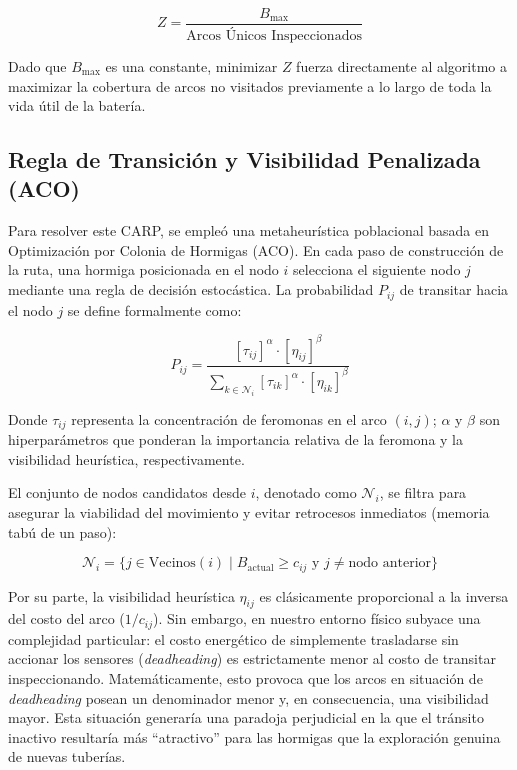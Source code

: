 \documentclass[conference]{IEEEtran}
\begin{document}
\begin{equation}
Z = \frac{B_{\text{max}}}{\text{Arcos Únicos Inspeccionados}}
\end{equation}

Dado que $B_{\text{max}}$ es una constante, minimizar $Z$ fuerza directamente al algoritmo a maximizar la cobertura de arcos no visitados previamente a lo largo de toda la vida útil de la batería.

\subsection{Regla de Transición y Visibilidad Penalizada (ACO)}
Para resolver este CARP, se empleó una metaheurística poblacional basada en Optimización por Colonia de Hormigas (ACO). En cada paso de construcción de la ruta, una hormiga posicionada en el nodo $i$ selecciona el siguiente nodo $j$ mediante una regla de decisión estocástica. La probabilidad $P_{ij}$ de transitar hacia el nodo $j$ se define formalmente como:

\begin{equation}
P_{ij} = \frac{[\tau_{ij}]^{\alpha} \cdot [\eta_{ij}]^{\beta}}{\sum_{k \in \mathcal{N}_i} [\tau_{ik}]^{\alpha} \cdot [\eta_{ik}]^{\beta}}
\end{equation}

Donde $\tau_{ij}$ representa la concentración de feromonas en el arco $(i,j)$; $\alpha$ y $\beta$ son hiperparámetros que ponderan la importancia relativa de la feromona y la visibilidad heurística, respectivamente.

El conjunto de nodos candidatos desde $i$, denotado como $\mathcal{N}_i$, se filtra para asegurar la viabilidad del movimiento y evitar retrocesos inmediatos (memoria tabú de un paso):

\begin{equation}
\mathcal{N}_i = \{j \in \text{Vecinos}(i) \mid B_{\text{actual}} \geq c_{ij} \text{ y } j \neq \text{nodo anterior}\}
\end{equation}

Por su parte, la visibilidad heurística $\eta_{ij}$ es clásicamente proporcional a la inversa del costo del arco ($1/c_{ij}$). Sin embargo, en nuestro entorno físico subyace una complejidad particular: el costo energético de simplemente trasladarse sin accionar los sensores (\textit{deadheading}) es estrictamente menor al costo de transitar inspeccionando. Matemáticamente, esto provoca que los arcos en situación de \textit{deadheading} posean un denominador menor y, en consecuencia, una visibilidad mayor. Esta situación generaría una paradoja perjudicial en la que el tránsito inactivo resultaría más ``atractivo'' para las hormigas que la exploración genuina de nuevas tuberías.
\end{document}
